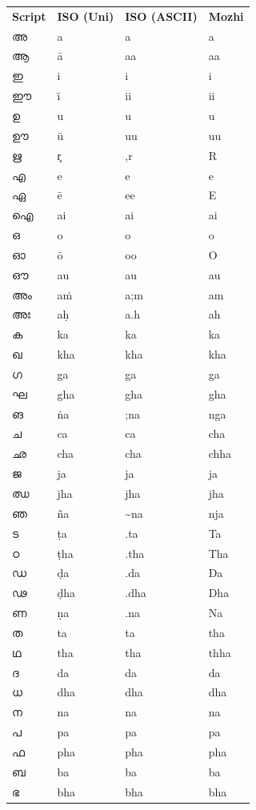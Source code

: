 \documentclass[a4paper]{article}
\newcommand{\ipa}[1]{{\cmuIPA{}#1}}
\begin{document}
\begin{longtable}[l]{p{2.3cm} p{2.3cm} p{2.3cm} p{2.3cm}}
\textbf{Script} & \textbf{ISO (Uni)} & \textbf{ISO (ASCII)} & \textbf{Mozhi} \\[1ex]
അ & a & a & a \\
ആ & ā & aa & aa \\
ഇ & i & i & i \\
ഈ & ī & ii & ii \\
ഉ & u & u & u \\
ഊ & ū & uu & uu \\
ഋ & \ipa{r̥} & ,r & R \\
എ & e & e & e \\
ഏ & ē & ee & E \\
ഐ & ai & ai & ai \\
ഒ & o & o & o \\
ഓ & ō & oo & O \\
ഔ & au & au & au \\
അം & aṁ & a;m & am \\
അഃ & aḥ & a.h & ah \\
ക & ka & ka & ka \\
ഖ & kha & kha & kha \\
ഗ & ga & ga & ga \\
ഘ & gha & gha & gha \\
ങ & ṅa & ;na & nga \\
ച & ca & ca & cha \\
ഛ & cha & cha & chha \\
ജ & ja & ja & ja \\
ഝ & jha & jha & jha \\
ഞ & ña & \textasciitilde{}na & nja \\
ട & ṭa & .ta & Ta \\
ഠ & ṭha & .tha & Tha \\
ഡ & ḍa & .da & Da \\
ഢ & ḍha & .dha & Dha \\
ണ & ṇa & .na & Na \\
ത & ta & ta & tha \\
ഥ & tha & tha & thha \\
ദ & da & da & da \\
ധ & dha & dha & dha \\
ന & na & na & na \\
പ & pa & pa & pa \\
ഫ & pha & pha & pha \\
ബ & ba & ba & ba \\
ഭ & bha & bha & bha \\

\end{longtable}
\end{document}
